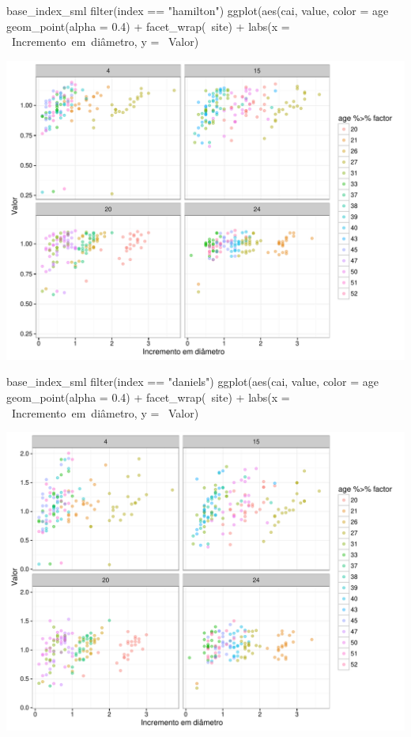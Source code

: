 \documentclass[article]{jss}
\begin{document}
\begin{CodeChunk}
\begin{CodeInput}
base_index_sml %
  filter(index == "hamilton") %
  ggplot(aes(cai, value, color = age %
    geom_point(alpha = 0.4) +
    facet_wrap(~site) +
    labs(x = ~Incremento~em~diâmetro, y = ~Valor)
\end{CodeInput}


\begin{center}\includegraphics{comp3-paper_files/figure-latex/unnamed-chunk-18-1} \end{center}

\end{CodeChunk}

\begin{CodeChunk}
\begin{CodeInput}
base_index_sml %
  filter(index == "daniels") %
  ggplot(aes(cai, value, color = age %
    geom_point(alpha = 0.4) +
    facet_wrap(~site) +
    labs(x = ~Incremento~em~diâmetro, y = ~Valor)
\end{CodeInput}


\begin{center}\includegraphics{comp3-paper_files/figure-latex/unnamed-chunk-19-1} \end{center}

\end{CodeChunk}
\end{document}
